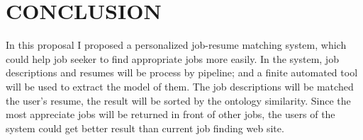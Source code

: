 \chapter{CONCLUSION}
In this proposal I proposed a personalized job-resume matching system, which could help job seeker to find appropriate jobs more easily. In the system, job descriptions and resumes will be process by pipeline; and a finite automated tool will be used to extract the model of them. The job descriptions will be matched the user's resume, the result will be sorted by the ontology similarity. Since the most appreciate jobs will be returned in front of other jobs, the users of the system could get better result than current job finding web site. 